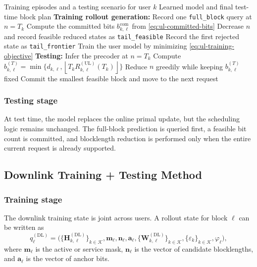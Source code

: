 \documentclass[11pt]{article}
\newcommand{\Kset}{\mathcal{K}}
\newcommand{\Hc}{\mathbf{H}}
\newcommand{\Wmat}{\mathbf{W}}
\newcommand{\floor}[1]{\left\lfloor #1 \right\rfloor}
\newcommand{\UL}{\mathrm{UL}}
\newcommand{\DL}{\mathrm{DL}}
\begin{document}
\begin{algorithm}[ht]
\caption{Uplink Training + Testing Method}
\label{alg:ul-train-test}
\begin{algorithmic}[1]
\Require Training episodes and a testing scenario for user $k$
\Ensure Learned model and final test-time block plan
\State \textbf{Training rollout generation:}
    \State Record one \texttt{full\_block} query at $n=T_k$
    \State Compute the committed bits $b_{k,\ell}^{\mathrm{com}}$ from \eqref{eq:ul-committed-bits}
        \State Decrease $n$ and record feasible reduced states as \texttt{tail\_feasible}
        \State Record the first rejected state as \texttt{tail\_frontier}
    \EndIf
\EndFor
\State Train the user model by minimizing \eqref{eq:ul-training-objective}
\State \textbf{Testing:}
    \State Infer the precoder at $n=T_k$
    \State Compute $b_{k,\ell}^{(T)}=\min\{d_{k,\ell},\floor{T_kR_{k,\ell}^{(\UL)}(T_k)}\}$
        \State Reduce $n$ greedily while keeping $b_{k,\ell}^{(T)}$ fixed
    \EndIf
    \State Commit the smallest feasible block and move to the next request
\EndWhile
\end{algorithmic}
\end{algorithm}

\subsubsection{Testing stage}

At test time, the model replaces the online primal update, but the scheduling
logic remains unchanged. The full-block prediction is queried first, a feasible
bit count is committed, and blocklength reduction is performed only when the
entire current request is already supported.

\subsection{Downlink Training + Testing Method}

\subsubsection{Training stage}

The downlink training state is joint across users. A rollout state for block
$\ell$ can be written as
\begin{equation}
q_{\ell}^{(\DL)}
=
\bigl(
\{\Hc_{k,\ell}^{(\DL)}\}_{k\in\Kset},
\mathbf m_\ell,
\mathbf n_\ell,
\mathbf a_\ell,
\{\Wmat_{k,\ell}^{(\DL)}\}_{k\in\Kset},
\{\varepsilon_k\}_{k\in\Kset},
\varphi_\ell
\bigr),
\label{eq:dl-query}
\end{equation}
where $\mathbf m_\ell$ is the active or service mask, $\mathbf n_\ell$ is the
vector of candidate blocklengths, and $\mathbf a_\ell$ is the vector of anchor
bits.
\end{document}
